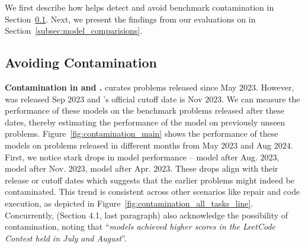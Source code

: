 We first describe how \livecodebench{} helps detect and avoid benchmark contamination in Section~\ref{subsec:contamination}. 
Next, we present the findings from our evaluations on \livecodebench{} in Section~\ref{subsec:model_comparisions}.



\subsection{Avoiding Contamination}
\label{subsec:contamination}

\noindent \textbf{Contamination in \deepseek{} and \gptfouro{}.}
\livecodebench{} curates problems released since May $2023$. 
However, \deepseek{} was released Sep $2023$ and \gptfouro{}'s official cutoff date is Nov $2023$.
We can measure the performance of these models on the benchmark problems released after these dates, thereby estimating the performance of the model on previously unseen problems.
Figure~\ref{fig:contamination_main} shows the performance of these models on \leetcode{} problems released in different months from May $2023$ and Aug $2024$. 
First, we notice stark drops in model performance --   model after Aug. $2023$, 
\gptfouro{} model after Nov. $2023$, 
\claudethrees{} model after Apr. $2023$.
These drops align with their release or cutoff dates which suggests that the earlier problems might indeed be contaminated.
This trend is consistent across other \livecodebench{} scenarios like repair and code execution, as depicted in Figure~\ref{fig:contamination_all_tasks_line}.
Concurrently, \citep{deepseek-coder} (Section 4.1, last paragraph) also acknowledge the possibility of \leetcode{} contamination, noting that ``\textit{models achieved higher scores in the LeetCode Contest held in July and August}''.

